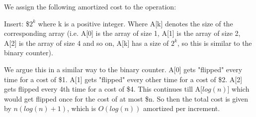 \documentclass{article}
\begin{document}
\begin{enumerate}[label=(\alph*)]
We assign the following amortized cost to the operation:

\newline Insert: \$$2^k$ where k is a positive integer. Where A[k] denotes the size of the corresponding array (i.e. A[0] is the array of size 1, A[1] is the array of size 2, A[2] is the array of size 4 and so on, A[k] has a size of $2^k$, so this is similar to the binary counter). 

We argue this in a similar way to the binary counter. A[0] gets "flipped" every time for a cost of \$1. A[1] gets "flipped" every other time for a cost of \$2. A[2] gets flipped every 4th time for a cost of \$4. This continues till A[$log(n)$] which would get flipped once for the cost of at most \$n. So then the total cost is given by $n(log(n) + 1)$, which is $O(log(n))$ amortized per increment.


\end{enumerate}
\end{document}
